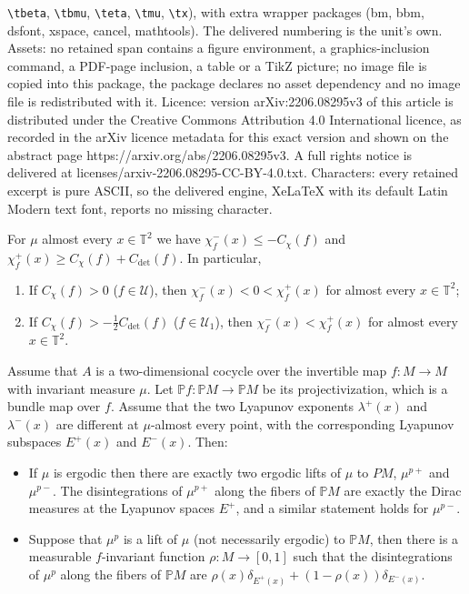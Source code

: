 \documentclass[10pt,a4paper]{amsart}
\newcommand{\Pp}{\mathbb P}
\newcommand{\TT}{\mathbb{T}^2}
\begin{document}
\texttt{\textbackslash tbeta}, \texttt{\textbackslash tbmu}, \texttt{\textbackslash teta}, \texttt{\textbackslash tmu}, \texttt{\textbackslash tx}), with extra wrapper packages (bm, bbm, dsfont, xspace, cancel, mathtools). The delivered numbering is the unit's own. Assets: no retained span contains a figure environment, a graphics-inclusion command, a PDF-page inclusion, a table or a TikZ picture; no image file is copied into this package, the package declares no asset dependency and no image file is redistributed with it. Licence: version arXiv:2206.08295v3 of this article is distributed under the Creative Commons Attribution 4.0 International licence, as recorded in the arXiv licence metadata for this exact version and shown on the abstract page https://arxiv.org/abs/2206.08295v3. A full rights notice is delivered at licenses/arxiv-2206.08295-CC-BY-4.0.txt. Characters: every retained excerpt is pure ASCII, so the delivered engine, XeLaTeX with its default Latin Modern text font, reports no missing character.
\begin{proposition}\label{pro:existeexpneg}
For $\mu$ almost every $x\in\TT$ we have $\chi^{-}_f(x)\leq -C_{\chi}(f)$ and $\chi^{+}_f(x)\geq C_{\chi}(f)+C_{\det}(f)$.
In particular,
\begin{enumerate}
\item
If $C_{\chi}(f)>0$ ($f\in\mathcal U$), then $\chi_f^-(x)<0<\chi_f^+(x)$ for almost every $x\in\TT$;
\item
If $C_{\chi}(f)>-\frac 12C_{\det}(f)$ ($f\in\mathcal U_1$), then $\chi_f^-(x)<\chi_f^+(x)$ for almost every $x\in\TT$.
\end{enumerate}
\end{proposition}

\begin{lemma}\label{le:projective}
Assume that $A$ is a two-dimensional cocycle over the invertible map $f:M\rightarrow M$ with invariant measure $\mu$. Let $\Pp f:\Pp M\rightarrow \Pp M$ be its projectivization, which is a bundle map over $f$. Assume that the two Lyapunov exponents $\lambda^+(x)$ and $\lambda^-(x)$ are different at $\mu$-almost every point, with the corresponding Lyapunov subspaces $E^+(x)$ and $E^-(x)$. Then:
\begin{itemize}
\item
If $\mu$ is ergodic then there are exactly two ergodic lifts of $\mu$ to $PM$, $\mu^{p+}$ and $\mu^{p-}$. The disintegrations of $\mu^{p+}$ along the fibers of $\Pp M$ are exactly the Dirac measures at the Lyapunov spaces $E^+$, and a similar statement holds for $\mu^{p-}$.
\item
Suppose that $\mu^p$ is a lift of $\mu$ (not necessarily ergodic) to $\Pp M$, then there is a measurable $f$-invariant function $\rho:M\rightarrow[0,1]$ such that the disintegrations of $\mu^p$ along the fibers of $\Pp M$ are $\rho(x)\delta_{E^+(x)}+(1-\rho(x))\delta_{E^-(x)}$.
\end{itemize}
\end{lemma}
\end{document}
